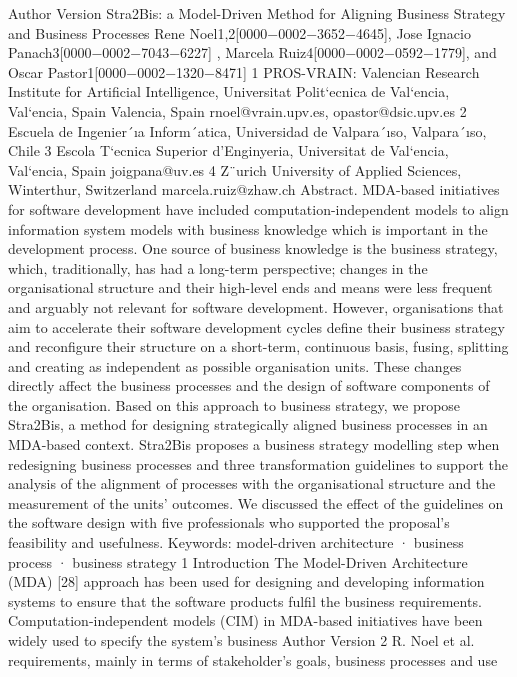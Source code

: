 Author Version
Stra2Bis: a Model-Driven Method for Aligning
Business Strategy and Business Processes
Rene Noel1,2[0000−0002−3652−4645], Jose Ignacio Panach3[0000−0002−7043−6227]
,
Marcela Ruiz4[0000−0002−0592−1779], and Oscar Pastor1[0000−0002−1320−8471]
1 PROS-VRAIN: Valencian Research Institute for Artificial Intelligence, Universitat
Polit`ecnica de Val`encia, Val`encia, Spain Valencia, Spain
{rnoel@vrain.upv.es, opastor@dsic.upv.es}
2 Escuela de Ingenier´ıa Inform´atica, Universidad de Valpara´ıso, Valpara´ıso, Chile
3 Escola T`ecnica Superior d’Enginyeria, Universitat de Val`encia, Val`encia, Spain
{joigpana@uv.es}
4 Z¨urich University of Applied Sciences, Winterthur, Switzerland
{marcela.ruiz@zhaw.ch}
Abstract. MDA-based initiatives for software development have included computation-independent models to align information system models with business knowledge which is important in the development process. One source of business knowledge is the business strategy, which,
traditionally, has had a long-term perspective; changes in the organisational structure and their high-level ends and means were less frequent
and arguably not relevant for software development. However, organisations that aim to accelerate their software development cycles define
their business strategy and reconfigure their structure on a short-term,
continuous basis, fusing, splitting and creating as independent as possible
organisation units. These changes directly affect the business processes
and the design of software components of the organisation. Based on this
approach to business strategy, we propose Stra2Bis, a method for designing strategically aligned business processes in an MDA-based context.
Stra2Bis proposes a business strategy modelling step when redesigning
business processes and three transformation guidelines to support the
analysis of the alignment of processes with the organisational structure
and the measurement of the units’ outcomes. We discussed the effect of
the guidelines on the software design with five professionals who supported the proposal’s feasibility and usefulness.
Keywords: model-driven architecture · business process · business strategy
1 Introduction
The Model-Driven Architecture (MDA) [28] approach has been used for designing and developing information systems to ensure that the software products fulfil the business requirements. Computation-independent models (CIM)
in MDA-based initiatives have been widely used to specify the system’s business
Author Version
2 R. Noel et al.
requirements, mainly in terms of stakeholder’s goals, business processes and use
